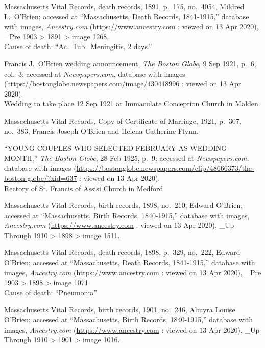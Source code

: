 \begin{thebibliography}{999}
	Massachusetts Vital Records, death records, 1891, p.\ 175, no.\ 4054, Mildred L.\ O'Brien; accessed at ``Massachusetts, Death Records, 1841-1915,'' database with images, \textit{Ancestry.com} (\url{https://www.ancestry.com} : viewed on 13 Apr 2020), \_Pre 1903 > 1891 > image 1268.\\
	Cause of death: ``Ac.\ Tub.\ Meningitis, 2 days.''
	
	Francis J.\ O'Brien wedding announcement, \textit{The Boston Globe}, 9 Sep 1921, p.\ 6, col.\ 3; accessed at \textit{Newspapers.com}, database with images (\url{https://bostonglobe.newspapers.com/image/430448996} : viewed on 13 Apr 2020).\\
	Wedding to take place 12 Sep 1921 at Immaculate Conception Church in Malden.
	
	Massachusetts Vital Records, Copy of Certificate of Marriage, 1921, p.\ 307, no.\ 383, Francis Joseph O'Brien and Helena Catherine Flynn.
	
	``YOUNG COUPLES WHO SELECTED FEBRUARY AS WEDDING MONTH,'' \textit{The Boston Globe}, 28 Feb 1925, p.\ 9; accessed at \textit{Newspapers.com}, database with images (\url{https://bostonglobe.newspapers.com/clip/48666373/the-boston-globe/?xid=637} : viewed on 13 Apr 2020).\\
	Rectory of St. Francis of Assisi Church in Medford
	
	Massachusetts Vital Records, birth records, 1898, no.\ 210, Edward O'Brien; accessed at ``Massachusetts, Birth Records, 1840-1915,'' database with images, \textit{Ancestry.com} (\url{https://www.ancestry.com} : viewed on 13 Apr 2020), \_Up Through 1910 > 1898 > image 1511.
	
	Massachusetts Vital Records, death records, 1898, p.\ 329, no.\ 222, Edward O'Brien; accessed at ``Massachusetts, Death Records, 1841-1915,'' database with images, \textit{Ancestry.com} (\url{https://www.ancestry.com} : viewed on 13 Apr 2020), \_Pre 1903 > 1898 > image 1071.\\
	Cause of death: ``Pneumonia''
	
	Massachusetts Vital Records, birth records, 1901, no.\ 246, Almyra Louise O'Brien; accessed at ``Massachusetts, Birth Records, 1840-1915,'' database with images, \textit{Ancestry.com} (\url{https://www.ancestry.com} : viewed on 13 Apr 2020), \_Up Through 1910 > 1901 > image 1016.
	

\end{thebibliography}
